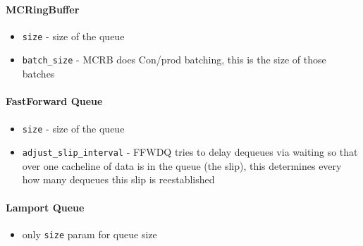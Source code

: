 \paragraph{MCRingBuffer}
\begin{itemize}
    \item \texttt{size} - size of the queue
    \item \texttt{batch\_size} - MCRB does Con/prod batching, this is the size of those batches
\end{itemize}

\paragraph{FastForward Queue}
\begin{itemize}
    \item \texttt{size} - size of the queue
    \item \texttt{adjust\_slip\_interval} - FFWDQ tries to delay dequeues via waiting so that over one
        cacheline of data is in the queue (the slip), this determines every how many dequeues this slip is
        reestablished 
\end{itemize}

\paragraph{Lamport Queue}
\begin{itemize}
    \item only \texttt{size} param for queue size
\end{itemize}

